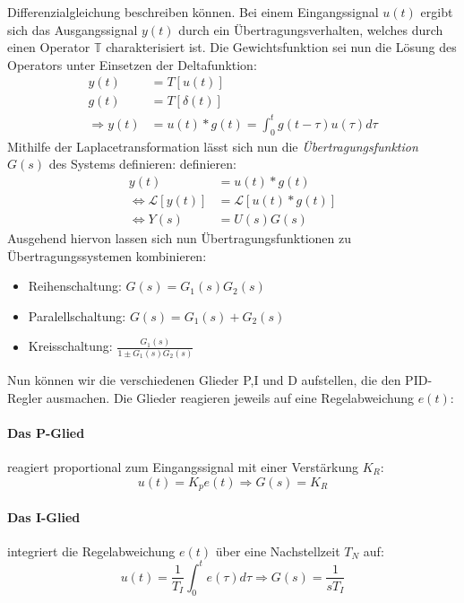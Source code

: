 Differenzialgleichung beschreiben können.
Bei einem Eingangssignal $u(t)$ ergibt sich das Ausgangssignal $y(t)$ durch ein
Übertragungsverhalten, welches durch einen Operator $\mathbb{T}$ charakterisiert ist.
Die Gewichtsfunktion sei nun die Lösung des Operators unter Einsetzen der Deltafunktion:
\begin{align} 
y(t) &= T\left [ u(t) \right ] \\
g(t) &= T \left [ \delta(t) \right ] \\
\Rightarrow y(t) &= u(t) * g(t) = \int_{0}^{t}g(t-\tau)u(\tau)d\tau 
\end{align} 
Mithilfe der Laplacetransformation lässt sich nun die \textit{Übertragungsfunktion} $G(s)$
des Systems definieren:
definieren:
\begin{align} 
y(t) &= u(t) * g(t) \\
\Leftrightarrow \mathcal{L}\left [y(t)\right ] &= \mathcal{L}\left [u(t) * g(t)\right ]\\
\Leftrightarrow Y(s) &= U(s)G(s)
\end{align} 
Ausgehend hiervon lassen sich nun Übertragungsfunktionen zu Übertragungssystemen kombinieren:
\begin{itemize}
\item Reihenschaltung: $G(s) = G_1(s)G_2(s)$
\item Paralellschaltung: $G(s) = G_1(s) + G_2(s)$
\item Kreisschaltung: $\frac{G_1(s)}{1\pm G_1(s)G_2(s)}$
\end{itemize}
Nun können wir die verschiedenen Glieder P,I und D aufstellen, die den PID-Regler ausmachen.
Die Glieder reagieren jeweils auf eine Regelabweichung $e(t)$: 
\paragraph{Das P-Glied} reagiert proportional zum Eingangssignal mit einer Verstärkung $K_R$:
\begin{equation}
u(t) = K_p e(t) \Rightarrow G(s) = K_R
\end{equation}
\paragraph{Das I-Glied} integriert die Regelabweichung $e(t)$ über eine Nachstellzeit $T_N$ auf:
\begin{equation}
u(t)= \frac{1}{T_I}\int_{0}^{t}e(\tau)d\tau \Rightarrow G(s) = \frac{1}{sT_I}
\end{equation}
